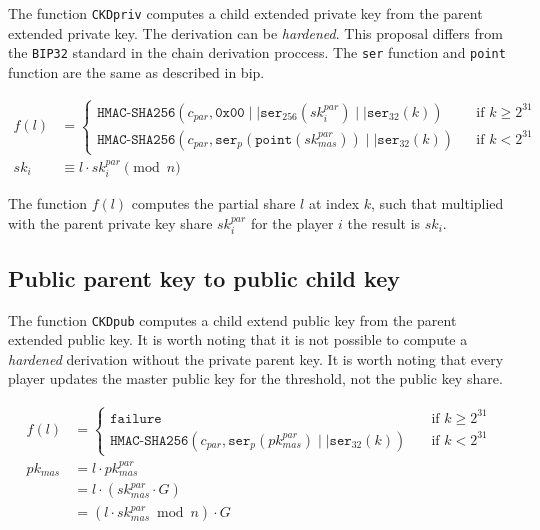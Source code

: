 The function \texttt{CKDpriv} computes a child extended private key from the
parent extended private key. The derivation can be \textit{hardened}. This
proposal differs from the \texttt{BIP32} \cite{HDWallets} standard in the chain
derivation proccess. The \texttt{ser} function and \texttt{point} function are
the same as described in \gls{bip}.

\begin{equation*}
\begin{split}
  f(l) &=
  \begin{cases}
    \texttt{HMAC-SHA256}(c_{par}, \texttt{0x00}\mid\mid \texttt{ser}_{256}(sk_i^{par}) \mid\mid \texttt{ser}_{32}(k)) & \quad \text{if } k \geq 2^{31}\\
    \texttt{HMAC-SHA256}(c_{par}, \texttt{ser}_{p}(\texttt{point}(sk_{mas}^{par})) \mid\mid \texttt{ser}_{32}(k)) & \quad \text{if } k < 2^{31}
  \end{cases} \\
  sk_i &\equiv l \cdot sk_i^{par} \pmod n
\end{split}
\end{equation*}

The function $f(l)$ computes the partial share $l$ at index $k$, such that
multiplied with the parent private key share $sk_i^{par}$ for the player $i$ the
result is $sk_i$.

\subsection{Public parent key to public child key}

The function \texttt{CKDpub} computes a child extend public key from the parent
extended public key. It is worth noting that it is not possible to compute a
\textit{hardened} derivation without the private parent key. It is worth noting
that every player updates the master public key for the threshold, not the
public key share.

\begin{equation*}
\begin{split}
  f(l) &=
  \begin{cases}
    \texttt{failure} & \quad \text{if } k \geq 2^{31}\\
    \texttt{HMAC-SHA256}(c_{par}, \texttt{ser}_{p}(pk_{mas}^{par}) \mid\mid \texttt{ser}_{32}(k)) & \quad \text{if } k < 2^{31}
  \end{cases} \\
  pk_{mas} &= l \cdot pk_{mas}^{par}\\
      &= l \cdot (sk_{mas}^{par} \cdot G)\\
      &= (l \cdot sk_{mas}^{par} \bmod n) \cdot G
\end{split}
\end{equation*}

